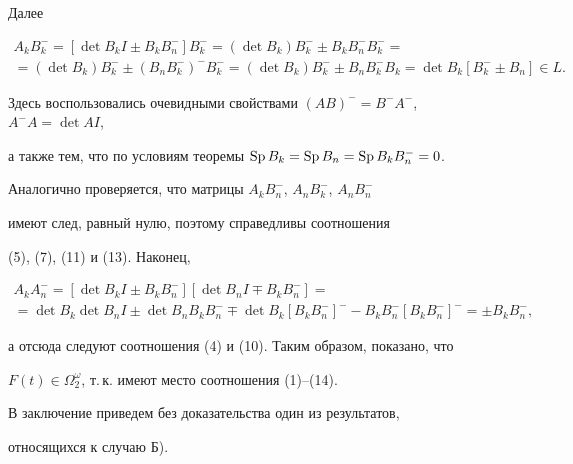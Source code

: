  


Далее 


\begin{multline*} 


A_k B^-_k=[\det B_k I\pm B_k B^-_n]B^-_k=(\det B_k)B^-_k\pm 


B_k B^-_n B^-_k= \\ 


=(\det B_k)B^-_k\pm(B_n B^-_k)^- B^-_k=(\det B_k) 


B^-_k\pm B_n B^-_k B_k=\det B_k[B^-_k\pm B_n]\in L. 


\end{multline*} 


 


Здесь воспользовались очевидными свойствами $(AB)^-=B^-A^-$, $A^-A=\det A I$, 


а также тем, что по условиям теоремы $\operatorname{Sp} B_k=\operatorname{Sp} B_n=\operatorname{Sp} B_k B^-_n=0$. 


Аналогично проверяется, что матрицы $A_k B^-_n$, $A_n B^-_k$, $A_n B^-_n$ 


имеют след, равный нулю, поэтому справедливы соотношения 


(5), (7), (11) и (13). Наконец, 


\begin{multline*} 


A_k A^-_n=[\det B_k I\pm B_k B^-_n][\det B_n I\mp B_k B^-_n]=\\ 


=\det B_k\det B_n I\pm \det B_n B_k B^-_n\mp\det B_k 


[B_k B^-_n]^--B_k B^-_n[B_k B^-_n]^-=\pm B_k B^-_n, 


\end{multline*} 


а отсюда следуют соотношения (4) и (10). Таким образом, показано, что 


$F(t)\in\Omega^\omega_2$, т.\,к. имеют место соотношения (1)--(14). 


 


В заключение приведем без доказательства один из результатов, 


относящихся к случаю Б). 


 


 


